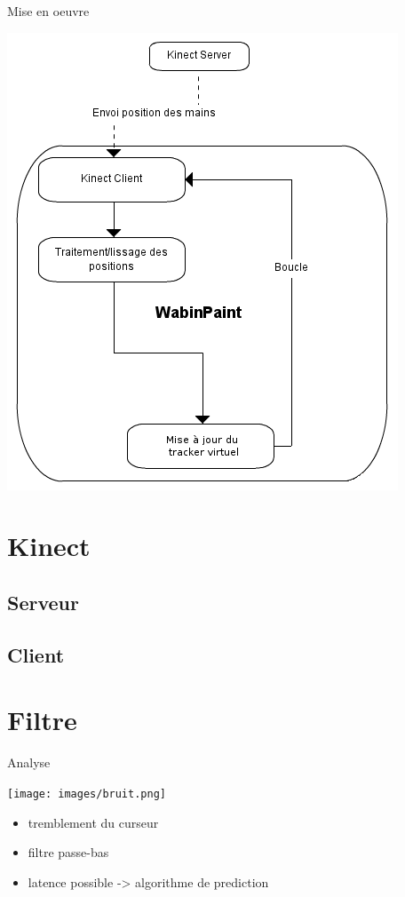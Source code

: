 \documentclass[12pt]{beamer}
\begin{document}
\begin{frame}{Mise en oeuvre}
	\begin{center}
		\includegraphics[scale=0.4]{images/plan.png}
	\end{center}
\end{frame}
\section{Kinect}

\subsection{Serveur}

\subsection{Client}



\section{Filtre}

\begin{frame}{Analyse}
	\begin{center}
		\texttt{[image: images/bruit.png]}
	\end{center}
	\begin{itemize}    
		\item tremblement du curseur
		\item filtre passe-bas
		\item latence possible -> algorithme de prediction
	\end{itemize}
\end{frame}
\end{document}
